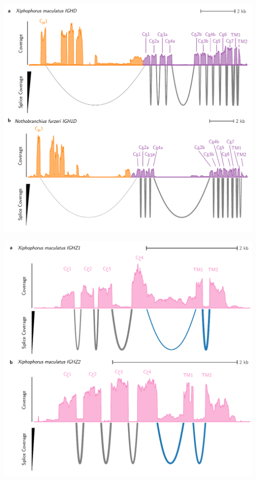 \documentclass[presentation]{beamer}
\begin{document}
\begin{frame}
\centering
\includegraphics[height=\textheight]{figs/pdf/extra/ighd-sashimi-nolab}
\end{frame}

\begin{frame}
\centering
\includegraphics[height=\textheight]{figs/pdf/extra/ighz-sashimi-nolab}
\end{frame}
\end{document}

